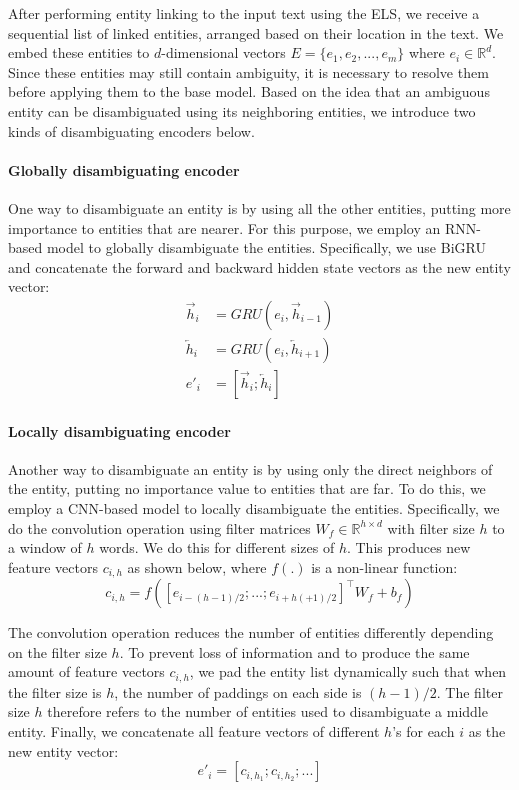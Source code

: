\documentclass[11pt,a4paper]{article}
\begin{document}
After performing entity linking to the input text using the ELS, we receive a sequential list of linked entities, arranged based on their location in the text. We embed these entities to $d$-dimensional vectors $E = \{e_1, e_2, ..., e_m\}$ where $e_i \in \mathbb{R}^d$. Since these entities may still contain ambiguity, it is necessary to resolve them before applying them to the base model. Based on the idea that an ambiguous entity can be disambiguated using its neighboring entities, we introduce two kinds of disambiguating encoders below.


\paragraph{Globally disambiguating encoder}

One way to disambiguate an entity is by using all the other entities, putting more importance to entities that are nearer. For this purpose, we employ an RNN-based model to globally disambiguate the entities. Specifically, we use BiGRU and concatenate the forward and backward hidden state vectors as the new entity vector:
\begin{align*}
    \overrightarrow{h}_i &= GRU(e_i, \overrightarrow{h}_{i-1}) \\
    \overleftarrow{h}_i &= GRU(e_i, \overleftarrow{h}_{i+1}) \\
    e'_i &= [\overrightarrow{h}_i; \overleftarrow{h}_i] \nonumber
\end{align*}

\paragraph{Locally disambiguating encoder}

Another way to disambiguate an entity is by using only the direct neighbors of the entity, putting no importance value to entities that are far. To do this, we employ a CNN-based model to locally disambiguate the entities. Specifically, we do the convolution operation using filter matrices $W_f \in \mathbb{R}^{h \times d}$ with filter size $h$ to a window of $h$ words. We do this for different sizes of $h$. This produces new feature vectors $c_{i,h}$ as shown below, where $f(.)$ is a non-linear function:
\begin{equation*}
    c_{i,h} = f([e_{i-(h-1)/2}; ...; e_{i+h(+1)/2}]^\top W_f + b_f) \nonumber
\end{equation*}

The convolution operation reduces the number of entities differently depending on the filter size $h$. To prevent loss of information and to produce the same amount of feature vectors $c_{i,h}$, we pad the entity list dynamically such that when the filter size is $h$, the number of paddings on each side is $(h-1)/2$. The filter size $h$ therefore refers to the number of entities used to disambiguate a middle entity. Finally, we concatenate all feature vectors of different $h$'s for each $i$ as the new entity vector:
\begin{equation*}
    e'_i = [c_{i,h_1}; c_{i, h_2}; ...] \nonumber
\end{equation*}
\end{document}
